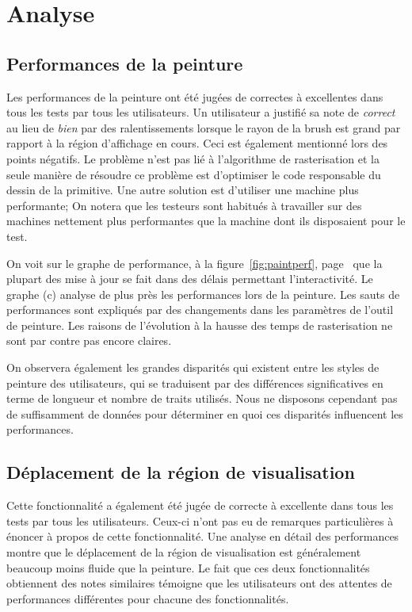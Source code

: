 	\section{Analyse}
		\subsection{Performances de la peinture}
		Les performances de la peinture ont été jugées de correctes à excellentes dans tous les tests par tous les utilisateurs. Un utilisateur
		a justifié sa note de \emph{correct} au lieu de \emph{bien} par des ralentissements lorsque le rayon de la brush est grand par rapport
		à la région d'affichage en cours. Ceci est également mentionné lors des points négatifs. 
		Le problème n'est pas lié à l'algorithme de rasterisation et la seule manière de résoudre ce problème est 
		d'optimiser le code responsable du dessin de la primitive. Une autre solution est d'utiliser une machine plus performante; On notera
		que les testeurs sont habitués à travailler sur des machines nettement plus performantes que la machine dont ils
		disposaient pour le test. 

		On voit sur le graphe de performance, à la figure~\ref{fig:paintperf}, page~\pageref{fig:paintperf} que la plupart des mise à jour
		se fait dans des délais permettant l'interactivité. Le graphe (c) analyse de plus près les performances lors de la peinture. Les sauts
		de performances sont expliqués par des changements dans les paramètres de l'outil de peinture. Les raisons de l'évolution à la hausse
		des temps de rasterisation ne sont par contre pas encore claires. 

		On observera également les grandes disparités qui existent entre les styles de peinture des utilisateurs, qui se traduisent par des
		différences significatives en terme de longueur et nombre de traits utilisés. Nous ne disposons cependant pas de suffisamment de
		données pour déterminer en quoi ces disparités influencent les performances. 

		\subsection{Déplacement de la région de visualisation}
		Cette fonctionnalité a également été jugée de correcte à excellente dans tous les tests par tous les utilisateurs. Ceux-ci n'ont pas
		eu de remarques particulières à énoncer à propos de cette fonctionnalité. Une analyse en détail des performances montre que le déplacement
		de la région de visualisation est généralement beaucoup moins fluide que la peinture. Le fait que ces deux fonctionnalités obtiennent des
		notes similaires témoigne que les utilisateurs ont des attentes de performances différentes pour chacune des fonctionnalités. 

